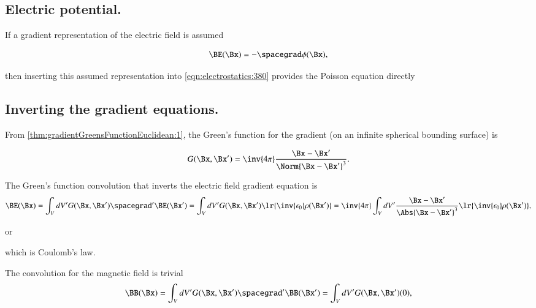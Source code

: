 \subsection{Electric potential.}

If a gradient representation of the electric field is assumed

\begin{dmath}\label{eqn:electrostatics:561}
\BE(\Bx) = -\spacegrad \phi(\Bx),
\end{dmath}

then
inserting
this assumed representation into \cref{eqn:electrostatics:380} provides the
Poisson equation directly


\subsection{Inverting the gradient equations.}

From \cref{thm:gradientGreensFunctionEuclidean:1}, the
 Green's function for the gradient (on an infinite spherical bounding surface) is

\begin{dmath}\label{eqn:electrostatics:260}
G(\Bx, \Bx') = \inv{4 \pi} \frac{\Bx - \Bx'}{\Norm{\Bx - \Bx'}^3}.
\end{dmath}

The Green's function convolution that inverts the electric field gradient equation is
\begin{dmath}\label{eqn:electrostatics:621}
\BE(\Bx)
= \int_V dV' G(\Bx, \Bx') \spacegrad' \BE(\Bx')
= \int_V dV' G(\Bx, \Bx') \lr{ \inv{\epsilon_0}\rho(\Bx') }
= \inv{4\pi} \int_V dV' \frac{\Bx - \Bx'}{ \Abs{\Bx - \Bx'}^3 } \lr{ \inv{\epsilon_0}\rho(\Bx') },
\end{dmath}

or

which is Coulomb's law.

The convolution for the magnetic field is trivial
\begin{dmath}\label{eqn:electrostatics:641}
\BB(\Bx)
= \int_V dV' G(\Bx, \Bx') \spacegrad' \BB(\Bx')
= \int_V dV' G(\Bx, \Bx') (0),
\end{dmath}

